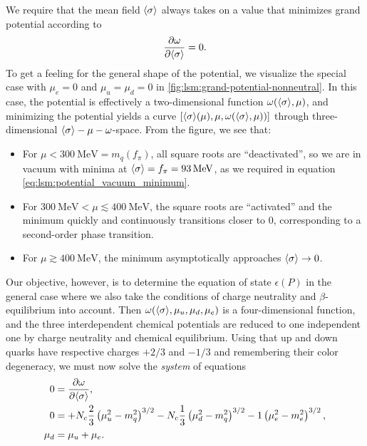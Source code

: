 We require that the mean field $\langle \sigma \rangle$ always takes on a value that minimizes grand potential according to 
\begin{equation}
	\pdv{\omega}{ \langle \sigma \rangle} = 0.
\end{equation}
To get a feeling for the general shape of the potential, we visualize the special case with $\mu_e = 0$ and $\mu_u = \mu_d = 0$ in \cref{fig:lsm:grand-potential-nonneutral}.
In this case, the potential is effectively a two-dimensional function $\omega(\langle \sigma \rangle,\mu)$, and minimizing the potential yields a curve $[\langle \sigma \rangle(\mu), \mu, \omega(\langle \sigma \rangle,\mu))]$ through three-dimensional $\langle \sigma \rangle-\mu-\omega$-space.
From the figure, we see that:
\begin{itemize}
\item For $\mu < \SI{300}{\mega\electronvolt} = m_q(f_\pi)$, all square roots are ``deactivated'', so we are in vacuum with minima at $\langle \sigma \rangle = f_\pi = \SI{93}{\mega\electronvolt}$, as we required in equation \eqref{eq:lsm:potential_vacuum_minimum}.
\item For $\SI{300}{\mega\electronvolt} < \mu \lesssim \SI{400}{\mega\electronvolt}$, the square roots are ``activated'' and the minimum quickly and continuously transitions closer to $0$, corresponding to a second-order phase transition.
\item For $\mu \gtrsim \SI{400}{\mega\electronvolt}$, the minimum asymptotically approaches $\langle \sigma \rangle \rightarrow 0$. 
\end{itemize}
Our objective, however, is to determine the equation of state $\epsilon(P)$ in the general case where we also take the conditions of charge neutrality  and $\beta$-equilibrium  into account.
Then $\omega(\langle \sigma \rangle,\mu_u,\mu_d,\mu_e)$ is a four-dimensional function, and the three interdependent chemical potentials are reduced to one independent one by charge neutrality and chemical equilibrium.
Using that up and down quarks have respective charges $+2/3$ and $-1/3$ and remembering their color degeneracy, we must now solve the \emph{system} of equations
\begin{subequations}
\begin{align}
	0 &= \pdv{\omega}{ \langle \sigma \rangle} , \label{eq:lsm:minsys_min} \\
	0 &= +N_c \frac23 \left( \mu_u^2 - m_q^2 \right)^{3/2} - N_c \frac13 \left( \mu_d^2 - m_q^2 \right)^{3/2} - 1 \left( \mu_e^2 - m_e^2 \right)^{3/2} , \label{eq:lsm:minsys_charge} \\
	\mu_d &= \mu_u + \mu_e . \label{eq:lsm:minsys_equilibrium}
\end{align}%
\label{eq:lsm:minsys}%
\end{subequations}%
